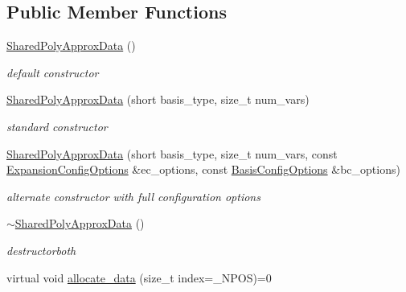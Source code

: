 \subsection*{Public Member Functions}
\begin{DoxyCompactItemize}
\item 
\hyperlink{classPecos_1_1SharedPolyApproxData_a9f917f0d09b1ba0a4f0891334f637cfa}{Shared\+Poly\+Approx\+Data} ()\label{classPecos_1_1SharedPolyApproxData_a9f917f0d09b1ba0a4f0891334f637cfa}

\begin{DoxyCompactList}\small\item\em default constructor \end{DoxyCompactList}\item 
\hyperlink{classPecos_1_1SharedPolyApproxData_a0c04bef8bf1a12210ed0d10c949c5e64}{Shared\+Poly\+Approx\+Data} (short basis\+\_\+type, size\+\_\+t num\+\_\+vars)\label{classPecos_1_1SharedPolyApproxData_a0c04bef8bf1a12210ed0d10c949c5e64}

\begin{DoxyCompactList}\small\item\em standard constructor \end{DoxyCompactList}\item 
\hyperlink{classPecos_1_1SharedPolyApproxData_ab6f5527d34817ae97049fcd20eb6df57}{Shared\+Poly\+Approx\+Data} (short basis\+\_\+type, size\+\_\+t num\+\_\+vars, const \hyperlink{classPecos_1_1ExpansionConfigOptions}{Expansion\+Config\+Options} \&ec\+\_\+options, const \hyperlink{classPecos_1_1BasisConfigOptions}{Basis\+Config\+Options} \&bc\+\_\+options)\label{classPecos_1_1SharedPolyApproxData_ab6f5527d34817ae97049fcd20eb6df57}

\begin{DoxyCompactList}\small\item\em alternate constructor with full configuration options \end{DoxyCompactList}\item 
\hyperlink{classPecos_1_1SharedPolyApproxData_ae794aa27980291b511413d7f41079c5b}{$\sim$\+Shared\+Poly\+Approx\+Data} ()\label{classPecos_1_1SharedPolyApproxData_ae794aa27980291b511413d7f41079c5b}

\begin{DoxyCompactList}\small\item\em destructorboth \end{DoxyCompactList}\item 
virtual void \hyperlink{classPecos_1_1SharedPolyApproxData_a86c7d9ddc7acd56e6c6e4355ea0bd7b5}{allocate\+\_\+data} (size\+\_\+t index=\+\_\+\+N\+P\+OS)=0\label{classPecos_1_1SharedPolyApproxData_a86c7d9ddc7acd56e6c6e4355ea0bd7b5}


\end{DoxyCompactItemize}
